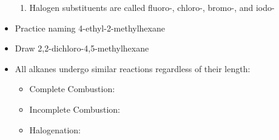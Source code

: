\documentclass[12pt, openany, letterpaper]{memoir}
\begin{document}
\begin{itemize}
\begin{enumerate}
		\item Halogen substituents are called fluoro-, chloro-, bromo-, and iodo-
	\end{enumerate}
	\item Practice naming 4-ethyl-2-methylhexane
	\item Draw 2,2-dichloro-4,5-methylhexane
	\item All alkanes undergo similar reactions regardless of their length:
	\begin{itemize}
		\item Complete Combustion: 
		\item Incomplete Combustion: 
		\item Halogenation: \\
		\hphantom{Halogenation: } 
	\end{itemize}	
\end{itemize}
\end{document}
